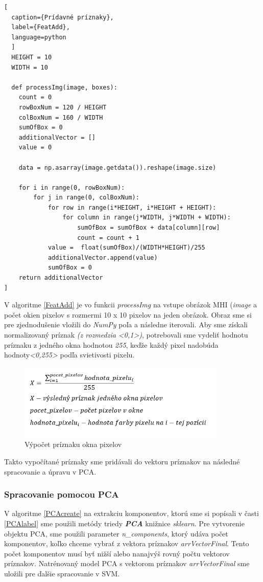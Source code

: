 \begin{lstlisting}[
  caption={Prídavné príznaky},
  label={FeatAdd},
  language=python
  ]
  HEIGHT = 10 
  WIDTH = 10
  
  def processImg(image, boxes):
    count = 0
    rowBoxNum = 120 / HEIGHT
    colBoxNum = 160 / WIDTH
    sumOfBox = 0
    additionalVector = []
    value = 0
        
    data = np.asarray(image.getdata()).reshape(image.size)
    
    for i in range(0, rowBoxNum):
        for j in range(0, colBoxNum):
            for row in range(i*HEIGHT, i*HEIGHT + HEIGHT):
                for column in range(j*WIDTH, j*WIDTH + WIDTH):
                    sumOfBox = sumOfBox + data[column][row] 
                    count = count + 1
            value =  float(sumOfBox)/(WIDTH*HEIGHT)/255
            additionalVector.append(value)
            sumOfBox = 0
    return additionalVector
]

\end{lstlisting}

V algoritme \ref{FeatAdd} je vo funkcii \textit{processImg} na vstupe obrázok MHI (\textit{image} a počet okien pixelov s rozmermi 10 x 10 pixelov na jeden obrázok. Obraz sme si pre zjednodušenie vložili do \textit{NumPy} poľa a následne iterovali. Aby sme získali normalizovaný príznak \textit{(z rozmedzia <0,1>)}, potrebovali sme vydeliť hodnotu príznaku z jedného okna hodnotou \textit{255}, keďže každý pixel nadobúda hodnoty\textit{<0,255>} podľa svietivosti pixelu.

\begin{figure}[H]
  \centering
  \includegraphics[width=10cm]{img/AddFeat.png}
  \caption{Výpočet príznaku okna pixelov}
  \label{MHIbox}
\end{figure}   

Takto vypočítané príznaky sme pridávali do vektoru príznakov na následné spracovanie a úpravu v PCA.

\subsubsection{Spracovanie pomocou PCA} \label{PCAim}
V algoritme \ref{PCAcreate} na extrakciu komponentov, ktorú sme si popísali v časti \ref{PCAlabel} sme použili metódy triedy \textit{\textbf{PCA}} knižnice \textit{sklearn}. Pre vytvorenie objektu PCA, sme použili parameter \textit{n\_components}, ktorý udáva počet komponentov, koľko chceme vybrať z vektora príznakov \textit{arrVectorFinal}. Tento počet komponentov musí byť nižší alebo nanajvýš rovný počtu vektorov príznakov. Natrénovaný model PCA s vektorom príznakov \textit{arrVectorFinal} sme uložili pre ďalšie spracovanie v SVM.

